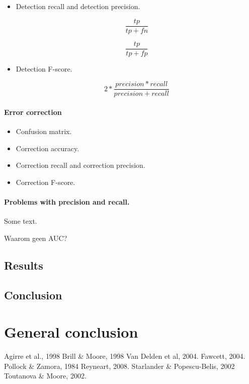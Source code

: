\documentclass[12pt]{article}
\let\stdsection\section
\renewcommand\section{\newpage\stdsection}
\begin{document}
\begin{itemize}
\item Detection recall and detection precision. 

\[
\frac{tp}{tp+fn}
\]

\[
\frac{tp}{tp+fp}
\]

\item Detection F-score. 

\[
2 * \frac{precision * recall}{precision + recall}
\]

\end{itemize}

\paragraph{Error correction}

\begin{itemize}
\item Confusion matrix.
\item Correction accuracy.
\item Correction recall and correction precision.
\item Correction F-score.
\end{itemize}

\paragraph{Problems with precision and recall.} Some text.

Waarom geen AUC?

\subsection{Results}

\subsection{Conclusion}

\section{General conclusion}

\begin{thebibliography}{99}

Agirre et al., 1998
Brill \& Moore, 1998
Van Delden et al, 2004.
Fawcett, 2004.
Pollock \& Zamora, 1984
Reyneart, 2008.
Starlander \& Popescu-Belis, 2002
Toutanova \& Moore, 2002.

\end{thebibliography}

\end{document}

